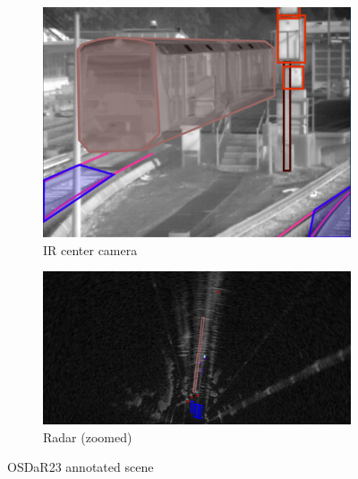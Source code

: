 \begin{figure}[H]
    \begin{subfigure}{0.45\textwidth}
        \centering
        \includegraphics[width=\textwidth]{PICs/datasets/OSDaR23_dataset/labeled_IR.png}
        \caption{IR center camera}
    \end{subfigure}%
    \hspace{0.05\textwidth}
    \begin{subfigure}{0.45\textwidth}
        \centering
        \includegraphics[width=\textwidth]{PICs/datasets/OSDaR23_dataset/labeled_Radar.png}
        \caption{Radar (zoomed)}
    \end{subfigure}
    
    \caption{OSDaR23 annotated scene \cite{oSDaR23}}
    \label{fig:OSDaR23_annotated}
\end{figure}



